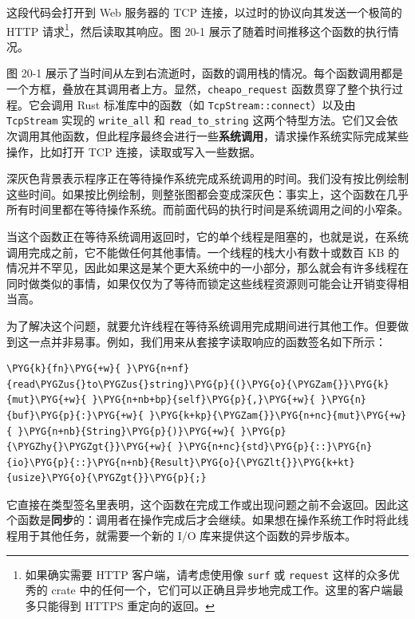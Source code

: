 这段代码会打开到 Web 服务器的 TCP 连接，以过时的协议向其发送一个极简的 HTTP 请求\footnote{如果确实需要 HTTP 客户端，请考虑使用像 \texttt{surf} 或 \texttt{request} 这样的众多优秀的 crate 中的任何一个，它们可以正确且异步地完成工作。这里的客户端最多只能得到 HTTPS 重定向的返回。}，然后读取其响应。图 20-1 展示了随着时间推移这个函数的执行情况。


图 20-1 展示了当时间从左到右流逝时，函数的调用栈的情况。每个函数调用都是一个方框，叠放在其调用者上方。显然，\texttt{cheapo\_request} 函数贯穿了整个执行过程。它会调用 Rust 标准库中的函数（如 \texttt{TcpStream::connect}）以及由 \texttt{TcpStream} 实现的 \texttt{write\_all} 和 \texttt{read\_to\_string} 这两个特型方法。它们又会依次调用其他函数，但此程序最终会进行一些\textbf{系统调用}，请求操作系统实际完成某些操作，比如打开 TCP 连接，读取或写入一些数据。

深灰色背景表示程序正在等待操作系统完成系统调用的时间。我们没有按比例绘制这些时间。如果按比例绘制，则整张图都会变成深灰色：事实上，这个函数在几乎所有时间里都在等待操作系统。而前面代码的执行时间是系统调用之间的小窄条。

当这个函数正在等待系统调用返回时，它的单个线程是阻塞的，也就是说，在系统调用完成之前，它不能做任何其他事情。一个线程的栈大小有数十或数百 KB 的情况并不罕见，因此如果这是某个更大系统中的一小部分，那么就会有许多线程在同时做类似的事情，如果仅仅为了等待而锁定这些线程资源则可能会让开销变得相当高。

为了解决这个问题，就要允许线程在等待系统调用完成期间进行其他工作。但要做到这一点并非易事。例如，我们用来从套接字读取响应的函数签名如下所示：

\begin{Verbatim}[commandchars=\\\{\},breaklines=true,breakanywhere=true,fontsize=\codefont,xleftmargin=17bp]
\PYG{k}{fn}\PYG{+w}{ }\PYG{n+nf}{read\PYGZus{}to\PYGZus{}string}\PYG{p}{(}\PYG{o}{\PYGZam{}}\PYG{k}{mut}\PYG{+w}{ }\PYG{n+nb+bp}{self}\PYG{p}{,}\PYG{+w}{ }\PYG{n}{buf}\PYG{p}{:}\PYG{+w}{ }\PYG{k+kp}{\PYGZam{}}\PYG{n+nc}{mut}\PYG{+w}{ }\PYG{n+nb}{String}\PYG{p}{)}\PYG{+w}{ }\PYG{p}{\PYGZhy{}\PYGZgt{}}\PYG{+w}{ }\PYG{n+nc}{std}\PYG{p}{::}\PYG{n}{io}\PYG{p}{::}\PYG{n+nb}{Result}\PYG{o}{\PYGZlt{}}\PYG{k+kt}{usize}\PYG{o}{\PYGZgt{}}\PYG{p}{;}
\end{Verbatim}

它直接在类型签名里表明，这个函数在完成工作或出现问题之前不会返回。因此这个函数是\textbf{同步}的：调用者在操作完成后才会继续。如果想在操作系统工作时将此线程用于其他任务，就需要一个新的 I/O 库来提供这个函数的异步版本。

